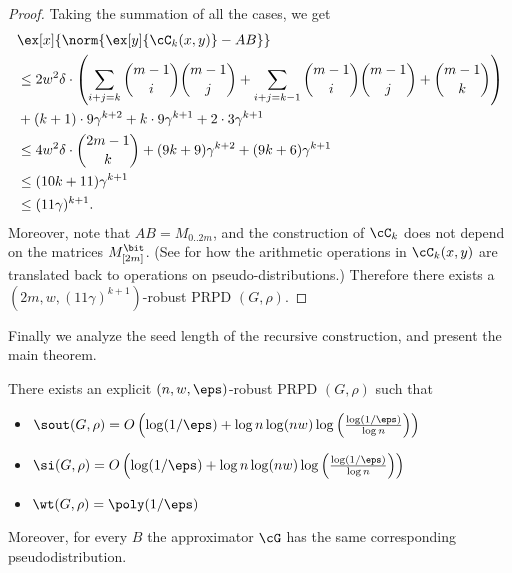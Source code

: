 \begin{proof}
Taking the summation of all the cases, we get 
\begin{align*}
&\ex[x]{\norm{\ex[y]{\cC_k(x,y)}-AB}}\\
&\le 2w^2\delta\cdot\left(\sum_{i+j=k}\binom{m-1}{i}\binom{m-1}{j}+\sum_{i+j=k-1}\binom{m-1}{i}\binom{m-1}{j}+\binom{m-1}{k}\right)\\
&+ (k+1)\cdot 9\gamma^{k+2}+ k\cdot 9\gamma^{k+1} + 2\cdot 3\gamma^{k+1} \\
&\le 4w^2\delta \cdot \binom{2m-1}{k} + (9k+9)\gamma^{k+2} + (9k+6)\gamma^{k+1}\\
&\le (10k+11)\gamma^{k+1}\\
&\le (11\gamma)^{k+1}.
\end{align*}
Moreover, note that $AB=M_{0..2m}$, and the construction of $\cC_k$ does not depend on the matrices $M_{[2m]}^{\bit}$. (See  for how the arithmetic operations in $\cC_k(x,y)$ are translated back to operations on pseudo-distributions.) Therefore there exists a $(2m,w,(11\gamma)^{k+1})$-robust PRPD $(G,\rho)$. 
\end{proof}
\noindent
Finally we analyze the seed length of the recursive construction, and present the main theorem.
\begin{theorem}
There exists an explicit $(n,w,\eps)$-robust PRPD $(G,\rho)$ such that 
\begin{itemize}
\item 
$\sout(G,\rho)= O\left(\log(1/\eps)+ \log n \log (nw)\log\left(\frac{\log(1/\eps)}{\log n}\right)\right)$
\item
$\si(G,\rho)= O\left(\log(1/\eps)+ \log n \log (nw)\log\left(\frac{\log(1/\eps)}{\log n}\right)\right)$
\item
$\wt(G,\rho)=\poly(1/\eps)$
\end{itemize}
Moreover, for every $B$ the approximator $\cG$ has the same corresponding pseudodistribution.
\end{theorem}
